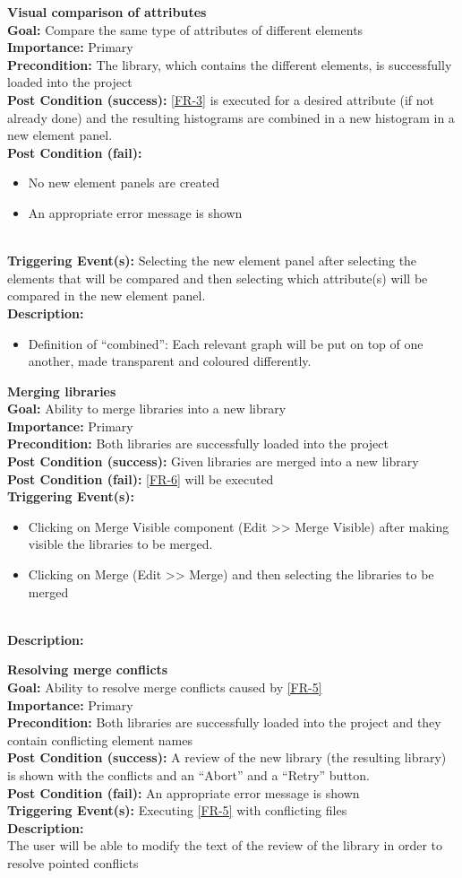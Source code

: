 \documentclass[10pt,a4paper]{report}
\newcommand{\precondition}[1]{
    \textbf{Precondition: } #1 \leavevmode \\
}
\newcommand{\FRDescription}[8]{
    \textbf{#1} \leavevmode \\
    \textbf{Goal: } #2 \leavevmode \\
    \textbf{Importance: } #3 \leavevmode \\
    \precondition{#4}
    \textbf{Post Condition (success): } #5 \leavevmode \\
    \textbf{Post Condition (fail): } #6 \leavevmode \\
    \textbf{Triggering Event(s): } #7 \leavevmode \\
    \textbf{Description: } \leavevmode \\ 
    #8}
\begin{document}
\begin{FR}
{\begin{itemize}
\begin{itemize}
        \end{itemize}
    \end{itemize}}
    \item \FRDescription{Visual comparison of attributes}
    {Compare the same type of attributes of different elements}
    {Primary}
    {The library, which contains the different elements,  is successfully loaded into the project}
    {\ref{FR-3} is executed for a desired attribute (if not already done) and the resulting histograms are combined in a new histogram in a new element panel.}
    {\begin{itemize}
        \item No new element panels are created
        \item An appropriate error message is shown
    \end{itemize}}
    {Selecting the new element panel after selecting the elements that will be compared and then selecting which attribute(s) will be compared in the new element panel.}
    {\begin{itemize}
        \item Definition of “combined”: Each relevant graph will be put on top of one another, made transparent and coloured differently.
    \end{itemize}}
    \item \FRDescription{Merging libraries}
    {Ability to merge libraries into a new library}
    {Primary}
    {Both libraries are successfully loaded into the project}
    {Given libraries are merged into a new library}
    {\ref{FR-6} will be executed}
    {\begin{itemize}
        \item Clicking on Merge Visible component (Edit >> Merge Visible) after making visible the libraries to be merged.
        \item Clicking on Merge (Edit >> Merge) and then selecting the libraries to be merged
    \end{itemize}}
    \item \FRDescription{Resolving merge conflicts}
    {Ability to resolve merge conflicts caused by \ref{FR-5}}
    {Primary}
    {Both libraries are successfully loaded into the project and they contain conflicting element names}
    {A review of the new library (the resulting library) is shown with the conflicts and an “Abort” and a “Retry” button.}
    {An appropriate error message is shown}
    {Executing \ref{FR-5} with conflicting files}
    {The user will be able to modify the text of the review of the library in order to resolve pointed conflicts
}
\end{FR}
\end{document}
